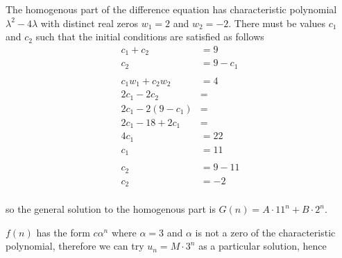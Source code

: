 \documentclass[10pt]{article}
\begin{document}
\begin{enumerate}
\begin{enumerate}
                The homogenous part of the difference equation has
                characteristic polynomial $\lambda^2 - 4\lambda$ with distinct
                real zeros $w_1 = 2$ and $w_2 = -2$. There must be values $c_1$
                and $c_2$ such that the initial conditions are satisfied as
                follows
                \begin{align*}
                    c_1 + c_2 &= 9 \\
                    c_2 &= 9 - c_1 \\
                    \\
                    c_1w_1 + c_2w_2 &= 4 \\
                    2c_1 - 2c_2 &= \\
                    2c_1 - 2(9 - c_1) &= \\
                    2c_1 - 18 + 2c_1 &= \\
                    4c_1 &= 22 \\
                    c_1 &= 11 \\
                    \\
                    c_2 &= 9 - 11 \\
                    c_2 &= -2 \\
                \end{align*}

                so the general solution to the homogenous
                part is $G(n) = A\cdot11^n + B\cdot2^n$.

                $f(n)$ has the form $c\alpha^n$ where $\alpha = 3$ and $\alpha$
                is not a zero of the characteristic polynomial, therefore we
                can try $u_n = M\cdot3^n$ as a particular solution, hence


\end{enumerate}
\end{enumerate}
\end{document}
